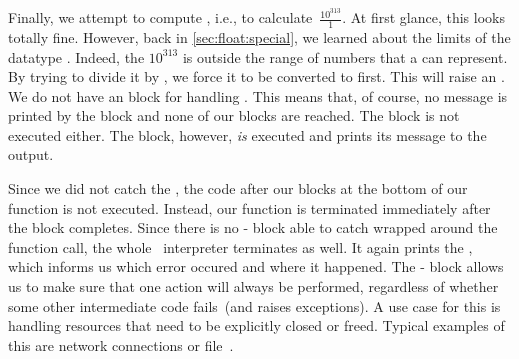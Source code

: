 Finally, we attempt to compute , i.e., to calculate~$\frac{10^{313}}{1}$.
At first glance, this looks totally fine.
However, back in \cref{sec:float:special}, we learned about the limits of the datatype .
Indeed, the  $10^{313}$ is outside the range of numbers that a  can represent.
By trying to divide it by , we force it to be converted to  first.
This will raise an .
We do not have an  block for handling .
This means that, of course, no message is printed by the  block and none of our  blocks are reached.
The  block is not executed either.
The  block, however, \emph{is} executed and prints its message to the output.

Since we did not catch the , the code after our blocks at the bottom of our function is not executed.
Instead, our function is terminated immediately after the  block completes.
Since there is no - block able to catch  wrapped around the function call, the whole \python\ interpreter terminates as well.
It again prints the , which informs us which error occured and where it happened.%
%
\FloatBarrier%
\endhsection%
%
%
%
\label{sec:withAndContextManagers}%
%
%
%
%
%
%
%
%
The - block allows us to make sure that one action will always be performed, regardless of whether some other intermediate code fails~(and raises exceptions).
A use case for this is handling resources that need to be explicitly closed or freed.
Typical examples of this are network connections or file~.

